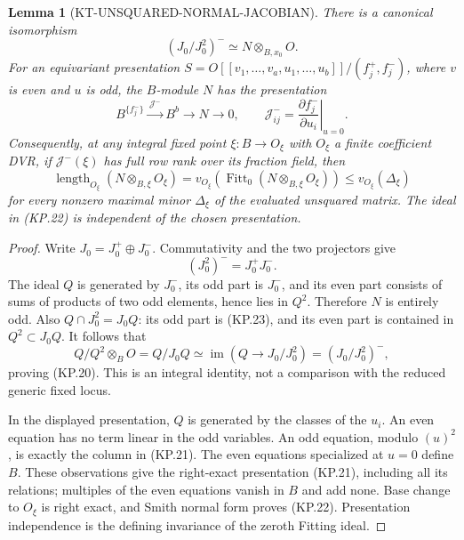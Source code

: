 \documentclass[11pt,a4paper]{article}
\newtheorem{lemma}[theorem]{Lemma}
\theoremstyle{definition}
\begin{document}
\begin{lemma}[KT-UNSQUARED-NORMAL-JACOBIAN]
There is a canonical isomorphism
\[
       (J_0/J_0^2)^-\simeq N\otimes_{B,x_0}O.               \tag{KP.20}
\]
For an equivariant presentation
$S=O[[v_1,\ldots,v_a,u_1,\ldots,u_b]]/(f^+_j,f^-_j)$,
where $v$ is even and $u$ is odd, the $B$-module $N$ has the
presentation
\[
 B^{\{f^-_j\}}\xrightarrow{\,\mathcal J^-\,}B^b
              \longrightarrow N\longrightarrow0,
 \qquad
 \mathcal J^-_{ij}=\left.\frac{\partial f^-_j}{\partial u_i}\right|_{u=0}.
                                                                  \tag{KP.21}
\]
Consequently, at any integral fixed point
$\xi:B\to O_\xi$ with $O_\xi$ a finite coefficient DVR,
if $\mathcal J^-(\xi)$ has full row rank over its fraction
field, then
\[
 \operatorname{length}_{O_\xi}(N\otimes_{B,\xi}O_\xi)
       =v_{O_\xi}\!\left(\operatorname{Fitt}_0
                  (N\otimes_{B,\xi}O_\xi)\right)
       \leq v_{O_\xi}(\Delta_\xi)                            \tag{KP.22}
\]
for every nonzero maximal minor $\Delta_\xi$ of the evaluated
unsquared matrix.  The ideal in (KP.22) is independent of
the chosen presentation.
\end{lemma}
\begin{proof}
Write $J_0=J_0^+\oplus J_0^-$.  Commutativity and the two
projectors give
\[
              (J_0^2)^-=J_0^+J_0^- .                        \tag{KP.23}
\]
The ideal $Q$ is generated by $J_0^-$, its odd part is
$J_0^-$, and its even part consists of sums of products of
two odd elements, hence lies in $Q^2$.  Therefore $N$ is
entirely odd.  Also
$Q\cap J_0^2=J_0Q$: its odd part is (KP.23), and its even
part is contained in $Q^2\subset J_0Q$.  It follows that
\[
 Q/Q^2\otimes_B O=Q/J_0Q
       \simeq\operatorname{im}(Q\to J_0/J_0^2)
       =(J_0/J_0^2)^-,
\]
proving (KP.20).  This is an integral identity, not a
comparison with the reduced generic fixed locus.

In the displayed presentation, $Q$ is generated by the
classes of the $u_i$.  An even equation has no term linear
in the odd variables.  An odd equation, modulo $(u)^2$,
is exactly the column in (KP.21).  The even equations
specialized at $u=0$ define $B$.  These observations give
the right-exact presentation (KP.21), including all its
relations; multiples of the even equations vanish in $B$
and add none.  Base change to $O_\xi$ is right exact, and
Smith normal form proves (KP.22).  Presentation independence
is the defining invariance of the zeroth Fitting ideal.
\end{proof}
\end{document}
